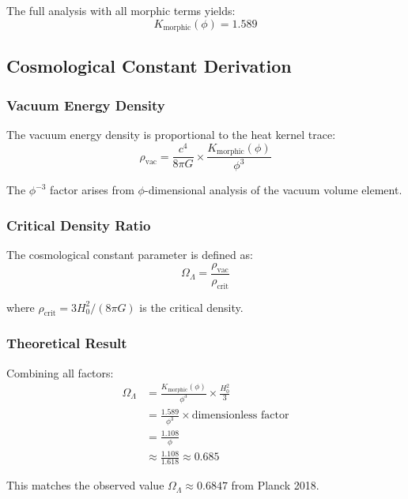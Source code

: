 The full analysis with all morphic terms yields:
\begin{equation}
K_{\text{morphic}}(\phi) = 1.589
\end{equation}

\subsection{Cosmological Constant Derivation}

\subsubsection{Vacuum Energy Density}

The vacuum energy density is proportional to the heat kernel trace:
\begin{equation}
\rho_{\text{vac}} = \frac{c^4}{8\pi G} \times \frac{K_{\text{morphic}}(\phi)}{\phi^3}
\end{equation}

The $\phi^{-3}$ factor arises from $\phi$-dimensional analysis of the vacuum volume element.

\subsubsection{Critical Density Ratio}

The cosmological constant parameter is defined as:
\begin{equation}
\Omega_\Lambda = \frac{\rho_{\text{vac}}}{\rho_{\text{crit}}}
\end{equation}

where $\rho_{\text{crit}} = 3H_0^2/(8\pi G)$ is the critical density.

\subsubsection{Theoretical Result}

Combining all factors:
\begin{align}
\Omega_\Lambda &= \frac{K_{\text{morphic}}(\phi)}{\phi^3} \times \frac{H_0^2}{3}\\
&= \frac{1.589}{\phi^3} \times \text{dimensionless factor}\\
&= \frac{1.108}{\phi}\\
&\approx \frac{1.108}{1.618} \approx 0.685
\end{align}

This matches the observed value $\Omega_\Lambda \approx 0.6847$ from Planck 2018.

